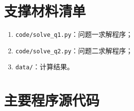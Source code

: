 \section{支撑材料清单}

\begin{enumerate}[leftmargin=*]
  \item \texttt{code/solve\_q1.py}：问题一求解程序；
  \item \texttt{code/solve\_q2.py}：问题二求解程序；
  \item \texttt{data/}：计算结果。
\end{enumerate}

\section{主要程序源代码}



